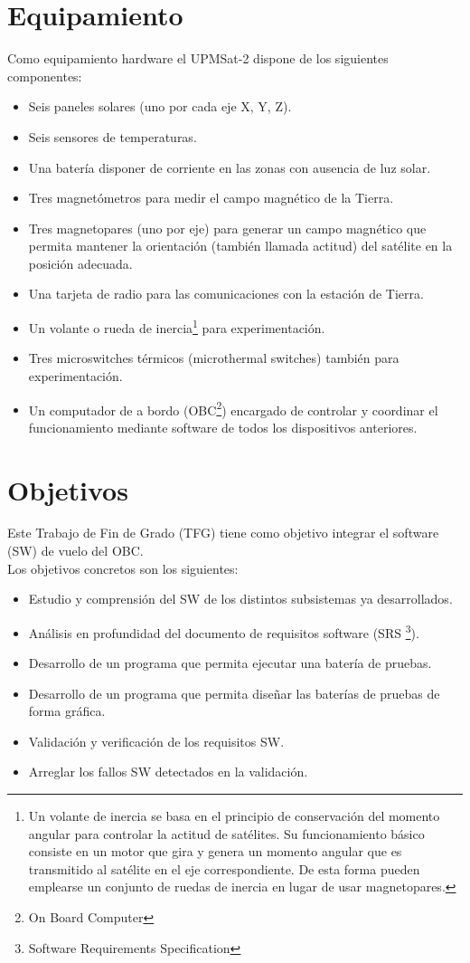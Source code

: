 \section{Equipamiento}
\label{sec:equipamiento}
Como equipamiento hardware el UPMSat-2 dispone de los siguientes componentes:
\begin{itemize}
\item Seis paneles solares (uno por cada eje X, Y, Z).
\item Seis sensores de temperaturas.
\item Una batería disponer de corriente en las zonas con ausencia de luz solar.
\item Tres magnetómetros para medir el campo magnético de la Tierra.
\item Tres magnetopares (uno por eje) para generar un campo magnético que permita
  mantener la orientación (también llamada actitud) del satélite en la
  posición adecuada.
\item Una tarjeta de radio para las comunicaciones con la estación de Tierra.
\item Un volante o rueda de inercia\footnote{Un volante de inercia se basa en el
    principio de conservación del momento angular para controlar la actitud de
    satélites. Su funcionamiento básico consiste en un motor que gira y genera
    un momento angular que es transmitido al satélite en el eje correspondiente.
    De esta forma pueden emplearse un conjunto de ruedas de inercia en lugar
    de usar magnetopares.} para experimentación.
\item Tres microswitches térmicos (microthermal switches) también para
  experimentación.
\item Un computador de a bordo (OBC\footnote{On Board Computer}) encargado de
  controlar y coordinar el funcionamiento mediante software de todos los
  dispositivos anteriores.
\end{itemize}
\section{Objetivos}
\label{sec:objetivos}

Este Trabajo de Fin de Grado (TFG) tiene como objetivo integrar el software (SW)
de vuelo del OBC.\\

Los objetivos concretos son los siguientes:
\begin{itemize}
\item Estudio y comprensión del SW de los distintos subsistemas ya
  desarrollados.
\item Análisis en profundidad del documento de requisitos software\cite{} (SRS
  \footnote{Software Requirements Specification}).
\item Desarrollo de un programa que permita ejecutar una batería de pruebas.
\item Desarrollo de un programa que permita diseñar las baterías de pruebas de
  forma gráfica.
\item Validación y verificación de los requisitos SW.
\item Arreglar los fallos SW detectados en la validación.
\end{itemize}


